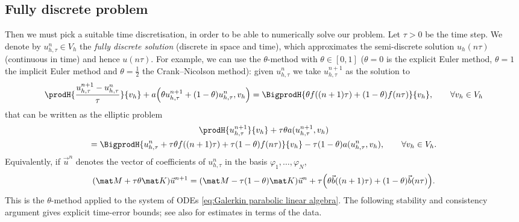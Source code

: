 \subsection{Fully discrete problem}
Then we must pick a suitable time discretisation, in order to be able to numerically solve our problem.
Let $\tau > 0$ be the time step.
We denote by $u_{h,\tau}^n \in V_h$ the \emph{fully discrete solution} (discrete in space and time), which approximates the semi-discrete solution $u_h(n\tau)$ (continuous in time) and hence $u(n\tau)$.
For example, we can use the $\theta$-method with $\theta \in [0,1]$ ($\theta = 0$ is the explicit Euler method, $\theta = 1$ the implicit Euler method and $\theta = \frac 1 2$ the Crank--Nicolson method): given $u_{h,\tau}^n$ we take $u_{h,\tau}^{n+1}$ as the solution to
\begin{equation*}
    \prodH{\frac{u_{h,\tau}^{n+1} - u_{h,\tau}^n}{\tau}}{v_h} + a\Big(\theta u_{h,\tau}^{n+1} + (1-\theta) u_{h,\tau}^n ,v_h\Big)
    = \BigprodH{\theta f((n+1)\tau) + (1-\theta) f(n\tau)}{v_h}, \qquad \forall v_h \in V_h
\end{equation*}
that can be written as the elliptic problem
\begin{multline*}
    \prodH{u_{h,\tau}^{n+1}} {v_h} + \tau \theta a(u_{h,\tau}^{n+1},v_h)
    \\
    = \BigprodH{u_{h,\tau}^n + \tau \theta f((n+1)\tau) + \tau (1-\theta) f(n\tau)}{v_h} - \tau (1-\theta) a(u_{h,\tau}^n , v_h) , \qquad \forall v_h \in V_h.
\end{multline*}
Equivalently, if $\vec u^n$ denotes the vector of coefficients of $u_{h,\tau}^n$ in the basis $\varphi_1, \dots, \varphi_N$,
\begin{equation*}
    ( \mat M + \tau \theta \mat K ) \vec u^{n+1} = (\mat M - \tau (1-\theta) \mat K) \vec u^n + \tau \Big( \theta \vec b((n+1)\tau) + (1-\theta) \vec b(n \tau) \Big).
\end{equation*}
This is the $\theta$-method applied to the system of ODEs \eqref{eq:Galerkin parabolic linear algebra}.
The following stability and consistency argument gives explicit time-error bounds; see also \cite[Chapter 11]{QuarteroniValli1994} for estimates in terms of the data.

